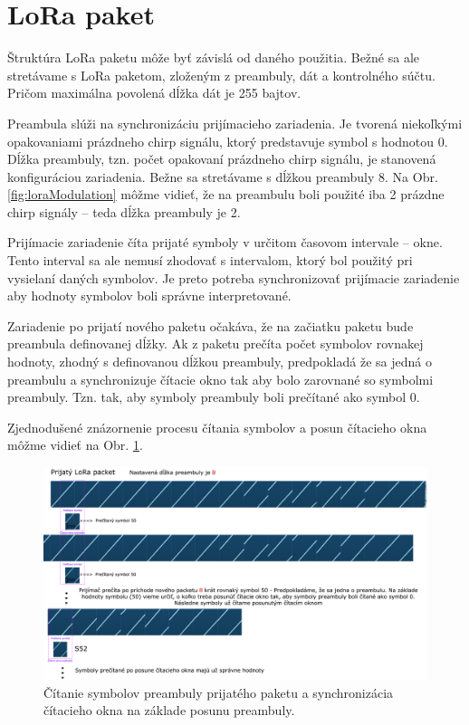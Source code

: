 \documentclass[slovak,master]{diploma}
\begin{document}
\section{LoRa paket}
Štruktúra LoRa paketu môže byť závislá od daného použitia. Bežné sa ale stretávame s LoRa paketom, zloženým z preambuly, dát a kontrolného súčtu. Pričom maximálna 
povolená dĺžka dát je 255 bajtov.

Preambula slúži na synchronizáciu prijímacieho zariadenia. Je tvorená niekoľkými opakovaniami prázdneho chirp signálu, ktorý predstavuje symbol s hodnotou 0. 
Dĺžka preambuly, tzn. počet opakovaní prázdneho chirp signálu, je stanovená konfiguráciou zariadenia. Bežne sa stretávame s dĺžkou preambuly 8.
Na Obr. \ref{fig:loraModulation} môžme vidieť, že na preambulu boli použité iba 2 prázdne chirp signály -- teda dĺžka preambuly je 2.

Prijímacie zariadenie číta prijaté symboly v určitom časovom intervale -- okne. Tento interval sa ale nemusí zhodovať s intervalom, ktorý bol použitý pri vysielaní daných symbolov.
Je preto potreba synchronizovať prijímacie zariadenie aby hodnoty symbolov boli správne interpretované.

Zariadenie po prijatí nového paketu očakáva, že na začiatku paketu bude preambula definovanej dĺžky. Ak z paketu prečíta počet symbolov rovnakej hodnoty, zhodný 
s definovanou dĺžkou preambuly, predpokladá že sa jedná o preambulu a synchronizuje čítacie okno tak aby bolo zarovnané so symbolmi preambuly. Tzn. tak, aby symboly preambuly boli 
prečítané ako symbol 0. 

Zjednodušené znázornenie procesu čítania symbolov a posun čítacieho okna môžme vidieť na Obr. \ref{fig:loraPreamble1}.

\begin{figure}[h!]
	\centering
	\includegraphics[width=1\textwidth]{Figures/preambulaSmall.png}
	\caption{Čítanie symbolov preambuly prijatého paketu a synchronizácia čítacieho okna na základe posunu preambuly.}
	\label{fig:loraPreamble1}
\end{figure}
\end{document}
